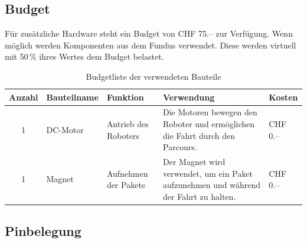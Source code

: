 \documentclass[11pt,a4paper]{article}
\begin{document}
	\noindent
	\subsection{Budget}
	Für zusätzliche Hardware steht ein Budget von CHF 75.-- zur Verfügung. Wenn möglich werden Komponenten aus dem Fundus verwendet. Diese werden virtuell mit 50\,\% ihres Wertes dem Budget belastet.
	
	\begin{table}[H]
		\centering
		\caption{Budgetliste der verwendeten Bauteile}
		\begin{tabularx}{\textwidth}{|c|l|X|X|X|}
			\hline
			\textbf{Anzahl} & \textbf{Bauteilname} & \textbf{Funktion} & \textbf{Verwendung} & \textbf{Kosten} 
			\\
			\hline
			
			1 & 
			DC-Motor & 
			Antrieb des Roboters & 
			Die Motoren bewegen den Roboter und ermöglichen die Fahrt durch den Parcours. & 
			CHF 0.-- \\
			\hline
			
			1 & 
			Magnet & 
			Aufnehmen der Pakete & 
			Der Magnet wird verwendet, um ein Paket aufzunehmen und während der Fahrt zu halten. & 
			CHF 0.-- \\
			\hline
			
		\end{tabularx}
	\end{table}
	
	\subsection{Pinbelegung}
	
\end{document}
